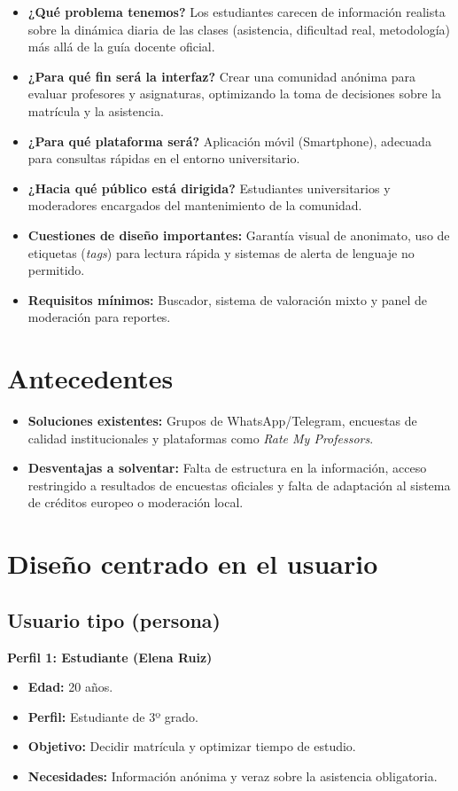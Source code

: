 \documentclass[12pt,oneside]{book}
\begin{document}
\begin{itemize}
    \item \textbf{¿Qué problema tenemos?} Los estudiantes carecen de información realista sobre la dinámica diaria de las clases (asistencia, dificultad real, metodología) más allá de la guía docente oficial.
    \item \textbf{¿Para qué fin será la interfaz?}  Crear una comunidad anónima para evaluar profesores y asignaturas, optimizando la toma de decisiones sobre la matrícula y la asistencia.
    \item \textbf{¿Para qué plataforma será?} Aplicación móvil (Smartphone), adecuada para consultas rápidas en el entorno universitario.
    \item \textbf{¿Hacia qué público está dirigida?} Estudiantes universitarios y moderadores encargados del mantenimiento de la comunidad.
    \item \textbf{Cuestiones de diseño importantes:} Garantía visual de anonimato, uso de etiquetas (\textit{tags}) para lectura rápida y sistemas de alerta de lenguaje no permitido.
    \item \textbf{Requisitos mínimos:} Buscador, sistema de valoración mixto y panel de moderación para reportes.
\end{itemize}

\section{Antecedentes}
\begin{itemize}
    \item \textbf{Soluciones existentes:} Grupos de WhatsApp/Telegram, encuestas de calidad institucionales y plataformas como \textit{Rate My Professors}.
    \item \textbf{Desventajas a solventar:} Falta de estructura en la información, acceso restringido a resultados de encuestas oficiales y falta de adaptación al sistema de créditos europeo o moderación local.
\end{itemize}

\section{Diseño centrado en el usuario}

\subsection{Usuario tipo (persona)}
\textbf{Perfil 1: Estudiante (Elena Ruiz)}
\begin{itemize}
    \item \textbf{Edad:} 20 años. 
    \item \textbf{Perfil:} Estudiante de 3º grado. 
    \item \textbf{Objetivo:} Decidir matrícula y optimizar tiempo de estudio. 
    \item \textbf{Necesidades:} Información anónima y veraz sobre la asistencia obligatoria. 
\end{itemize}
\end{document}
